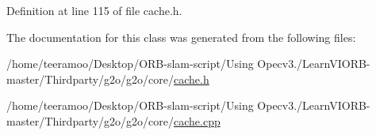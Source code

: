 Definition at line 115 of file cache.\+h.



The documentation for this class was generated from the following files\+:\begin{DoxyCompactItemize}
\item 
/home/teeramoo/\+Desktop/\+O\+R\+B-\/slam-\/script/\+Using Opecv3./\+Learn\+V\+I\+O\+R\+B-\/master/\+Thirdparty/g2o/g2o/core/\hyperlink{cache_8h}{cache.\+h}\item 
/home/teeramoo/\+Desktop/\+O\+R\+B-\/slam-\/script/\+Using Opecv3./\+Learn\+V\+I\+O\+R\+B-\/master/\+Thirdparty/g2o/g2o/core/\hyperlink{cache_8cpp}{cache.\+cpp}\end{DoxyCompactItemize}
